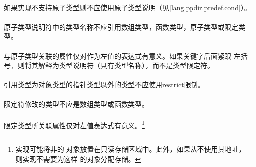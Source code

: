 
\syntax
\paragraph{}

\constraint
\paragraph{}
如果实现不支持原子类型则不应使用原子类型说明（见\ref{lang.ppdir.predef.cond}）。

\paragraph{}
原子类型说明符中的类型名称不应引用数组类型，函数类型，原子类型或限定类型。

\semantic
\paragraph{}
与原子类型关联的属性仅对作为左值的表达式有意义。如果关键字后面紧跟
左括号，则将其解释为类型说明符（具有类型名称），而不是类型限定符。

\syntax
\paragraph{}

\constraint
\paragraph{}
引用类型为对象类型的指针类型以外的类型不应使用restrict限制。

\paragraph{}
限定符修改的类型不应是数组类型或函数类型。

\semantic
\paragraph{}
限定类型所关联属性仅对左值表达式有意义。\footnote{实现可能将非的
对象放置在只读存储区域中。此外，如果从不使用其地址，则实现不需要为这样
的对象分配存储。}

